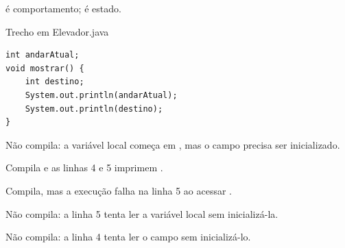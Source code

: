 \documentclass[11pt,a4paper]{article}
\begin{document}
\begin{minipage}[t]{.485\textwidth}
\begin{alternativas}
\item {} é comportamento;  é estado.
\end{alternativas}
\begin{alternativas}
\item {}
\item {}
\item {}
\item {}
\item {}
\end{alternativas}
\begin{painelEvolucao}{Trecho em Elevador.java}
\begin{lstlisting}[style=cenariocodigo]
int andarAtual;
void mostrar() {
    int destino;
    System.out.println(andarAtual);
    System.out.println(destino);
}
\end{lstlisting}
\end{painelEvolucao}
\begin{alternativas}
\item Não compila: a variável local começa em , mas o campo precisa ser inicializado.
\item Compila e as linhas 4 e 5 imprimem .
\item Compila, mas a execução falha na linha 5 ao acessar .
\item Não compila: a linha 5 tenta ler a variável local  sem inicializá-la.
\item Não compila: a linha 4 tenta ler o campo  sem inicializá-lo.
\end{alternativas}
\end{minipage}\hfill
\end{document}
